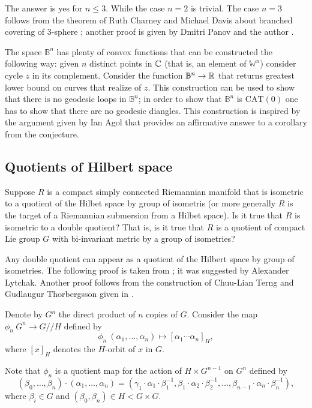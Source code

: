 The answer is yes for $n\le 3$.
While the case $n=2$ is trivial.
The case $n=3$ follows from the theorem of Ruth Charney and Michael Davis about branched covering of 3-sphere \cite{charney-davis};
another proof is given by Dmitri Panov and the author \cite{panov-petrunin-ramification}.

The space $\mathbb{B}^n$ has plenty of convex functions that can be constructed the following way:
given $n$ distinct points in $\mathbb{C}$ (that is, an element of $\mathbb{W}^n$) consider cycle $z$ in its complement.
Consider the function $\mathbb{B}^n\to \mathbb{R}$  that returns greatest lower bound on curves that realize of $z$. 
This construction can be used to show that there is no geodesic loops in $\mathbb{B}^n$;
in order to show that $\mathbb{B}^n$ is $\mathrm{CAT}(0)$ one has to show that there are no geodesic diangles.
This construction is inspired by the argument given by Ian Agol \cite{agol-braid} that provides an affirmative answer to a corollary from the conjecture. 


\subsection*{Quotients of Hilbert space}

\begin{pr} Suppose $R$ is a compact simply connected Riemannian manifold that is isometric to a quotient of the Hilbet space by group of isometris (or more generally $R$ is the target of a Riemannian submersion from a Hilbet space).
Is it true that $R$ is isometric to a double quotient?
That is, is it true that $R$ is a quotient of compact Lie group $G$ with bi-invariant metric by a group of isometries?
 
\end{pr}

Any double quotient can appear as a quotient of the Hilbert space by group of isometries.
The following proof is taken from \cite{lebedeva-petrunin-zolotov}; it was suggested by Alexander Lytchak.
Another proof follows from the construction of Chuu-Lian Terng and Gudlaugur Thorbergsson given in \cite[Section 4]{terng-thorbergsson}.

Denote by $G^n$ the direct product of $n$ copies of $G$.
Consider the map $\phi_n\:G^n\to G/\!\!/H$ defined by
\[\phi_n\:(\alpha_1,\dots,\alpha_n)\mapsto [\alpha_1\cdots\alpha_n]_H,\]
where $[x]_H$ denotes the $H$-orbit of $x$ in $G$.

Note that $\phi_n$ is a quotient map for the action of $H\times G^{n-1}$ on $G^n$ defined by
\[(\beta_0,\dots,\beta_n)\cdot(\alpha_1,\dots,\alpha_n)=(\gamma_1\cdot \alpha_1\cdot\beta_1^{-1},\beta_1\cdot\alpha_2\cdot\beta_2^{-1},\dots,\beta_{n-1}\cdot\alpha_n\cdot\beta_n^{-1}),\]
where $\beta_i\in G$ and $(\beta_0,\beta_n)\in H<G\times G$.

